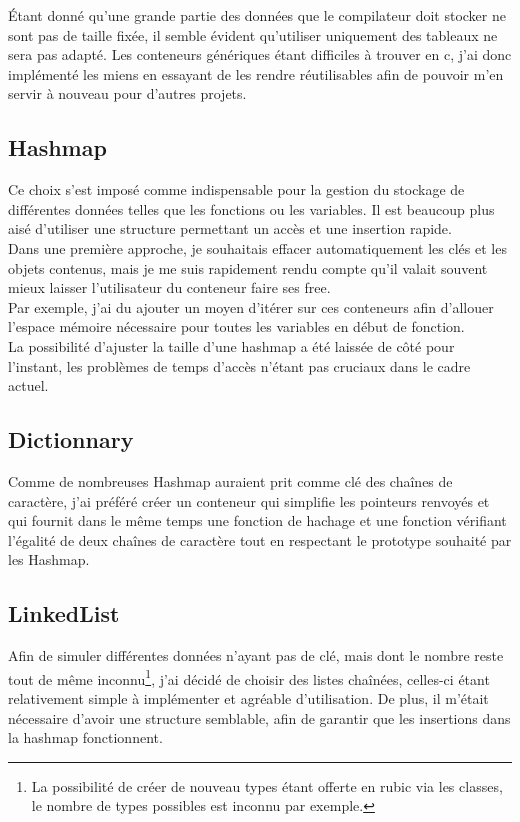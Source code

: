 \documentclass[12pt]{article}
\begin{document}
Étant donné qu'une grande partie des données que le compilateur doit stocker
ne sont pas de taille fixée, il semble évident qu'utiliser uniquement des
tableaux ne sera pas adapté. Les conteneurs génériques étant difficiles à
trouver en c, j'ai donc implémenté les miens en essayant de les rendre
réutilisables afin de pouvoir m'en servir à nouveau pour d'autres projets.

\subsection{Hashmap}
Ce choix s'est imposé comme indispensable pour la gestion du stockage
de différentes données telles que les fonctions ou les variables. Il est
beaucoup plus aisé d'utiliser une structure permettant un accès et une
insertion rapide.\\

Dans une première approche, je souhaitais effacer automatiquement les clés et
les objets contenus, mais je me suis rapidement rendu compte qu'il valait
souvent mieux laisser l'utilisateur du conteneur faire ses free.\\

Par exemple, j'ai du ajouter un moyen d'itérer sur ces conteneurs afin d'allouer
l'espace mémoire nécessaire pour toutes les variables en début de fonction.\\

La possibilité d'ajuster la taille d'une hashmap a été laissée de côté
pour l'instant, les problèmes de temps d'accès n'étant pas cruciaux dans le
cadre actuel.

\subsection{Dictionnary}
Comme de nombreuses Hashmap auraient prit comme clé des chaînes de caractère,
j'ai préféré créer un conteneur qui simplifie les pointeurs renvoyés et
qui fournit dans le même temps une fonction de hachage et une fonction
vérifiant l'égalité de deux chaînes de caractère tout en respectant le
prototype souhaité par les Hashmap.

\subsection{LinkedList}
Afin de simuler différentes données n'ayant pas de clé, mais dont le nombre
reste tout de même inconnu\footnote{La possibilité de créer de nouveau types
étant offerte en rubic via les classes, le nombre de types possibles est
inconnu par exemple.}, j'ai décidé de choisir des listes chaînées, celles-ci
étant relativement simple à implémenter et agréable d'utilisation. De plus,
il m'était nécessaire d'avoir une structure semblable, afin de garantir que
les insertions dans la hashmap fonctionnent.
\end{document}
